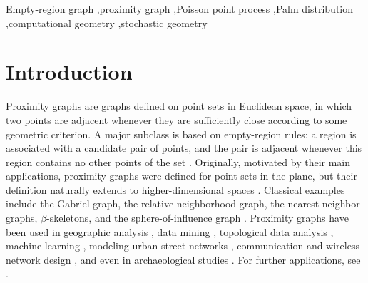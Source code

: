 \documentclass[a4paper,fleqn]{cas-dc}
\numberwithin{equation}{section}
\newcommand{\1}{\mathds{1}}
\newcommand{\0}{\mathbf{0}}
\begin{document}
\begin{keywords}
Empty-region graph \sep proximity graph \sep Poisson point process \sep Palm distribution \sep computational geometry \sep stochastic geometry
\end{keywords}

\maketitle


\section{Introduction}

Proximity graphs are graphs defined on point sets in Euclidean space, in which two points are adjacent whenever they are sufficiently close according to some geometric criterion. A major subclass is based on empty-region rules: a region is associated with a candidate pair of points, and the pair is adjacent whenever this region contains no other points of the set \citep{jaromczyk1992relative,cardinal2009empty}. Originally, motivated by their main applications, proximity graphs were defined for point sets in the plane, but their definition naturally extends to higher-dimensional spaces \citep{jaromczyk1991constructing,devroye1988expected}. Classical examples include the Gabriel graph, the relative neighborhood graph, the nearest neighbor graphs, $\beta$-skeletons, and the sphere-of-influence graph \citep{jaromczyk1992relative,mitchell2018,mathieson2019}. Proximity graphs have been used in geographic analysis \citep{gabriel1969statistical}, data mining \citep{toussaint2005geometric}, topological data analysis \citep{correa2011towards,jurkiewicz2023topohub}, machine learning \citep{marchette2005random,toussaint2012proximity}, modeling urban street networks \citep{watanabe2008evaluating,maravillo2023recovering}, communication and wireless-network design \citep{iguchi2008localized}, and even in archaeological studies \citep{jimenez2002application}. For further applications, see \citep{jaromczyk1992relative,toussaint2014applications,toussaint2014sphere}.
\end{document}
